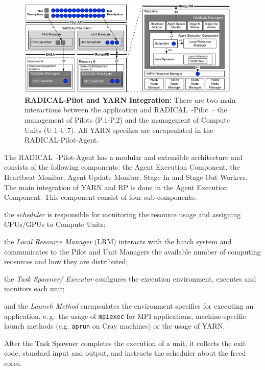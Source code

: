 \begin{figure}
    \centering
    \includegraphics[width=0.95\textwidth]{figures/data_analytics_hpc/hpc_hadoop/rp-architecture-yarn.pdf}
    \caption{\textbf{RADICAL-Pilot and YARN Integration:} There are two main interactions between the application and RADICAL~-Pilot -- the management of Pilots (P.1-P.2) and the management of Compute Units (U.1-U.7).  All YARN specifics are encapsulated in the RADICAL-Pilot-Agent.\label{fig:comp_rp_arch}}
\end{figure}

The RADICAL~-Pilot-Agent has a modular and extensible architecture and consists of the following components: the Agent Execution Component, the Heartbeat Monitor, Agent Update Monitor, Stage In and Stage Out Workers.
The main integration of YARN and RP is done in the Agent Execution Component.
This component consist of four sub-components:
\begin{inparaenum}[a)]
    \item the \textit{scheduler} is responsible for monitoring the resource usage and assigning CPUs/GPUs to Compute Units;
    \item the \textit{Local Resource Manager} (LRM) interacts with the batch system and communicates to the Pilot and Unit Managers the available number of computing reosurces and how they are distributed;
    \item the \textit{Task Spawner/ Executor} configures the execution environment, executes and monitors each unit; 
    \item and the \textit{Launch Method} encapsulates the environment specifics for executing an application, e.\,g.\ the usage of \texttt{mpiexec} for MPI applications, machine-specific launch methods (e.g. \texttt{aprun} on Cray machines) or the usage of YARN.
\end{inparaenum}
After the Task Spawner completes the execution of a unit, it collects the exit code, standard input and output, and instructs the scheduler about the freed cores.

